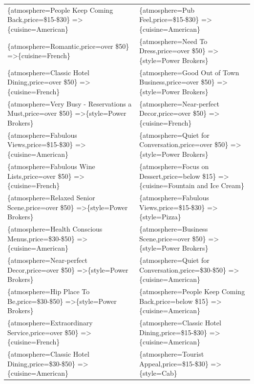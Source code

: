 \documentclass[letterpaper,10pt]{article}
\begin{document}
\begin{appendices}
\begin{table}[h]
\begin{adjustbox}{max width=\textwidth}
\begin{tabular}{ll}
\{atmosphere=People Keep Coming Back,price=\$15-\$30\} =\textgreater \{cuisine=American\} & \{atmosphere=Pub Feel,price=\$15-\$30\} =\textgreater \{cuisine=American\} \\ 
\{atmosphere=Romantic,price=over \$50\} =\textgreater \{cuisine=French\} & \{atmosphere=Need To Dress,price=over \$50\} =\textgreater \{style=Power Brokers\} \\ 
\{atmosphere=Classic Hotel Dining,price=over \$50\} =\textgreater \{cuisine=French\} & \{atmosphere=Good Out of Town Business,price=over \$50\} =\textgreater \{style=Power Brokers\} \\ 
\{atmosphere=Very Busy - Reservations a Must,price=over \$50\} =\textgreater \{style=Power Brokers\} & \{atmosphere=Near-perfect Decor,price=over \$50\} =\textgreater \{cuisine=French\} \\ 
\{atmosphere=Fabulous Views,price=\$15-\$30\} =\textgreater \{cuisine=American\} & \{atmosphere=Quiet for Conversation,price=over \$50\} =\textgreater \{style=Power Brokers\} \\ 
\{atmosphere=Fabulous Wine Lists,price=over \$50\} =\textgreater \{cuisine=French\} & \{atmosphere=Focus on Dessert,price=below \$15\} =\textgreater \{cuisine=Fountain and Ice Cream\} \\ 
\{atmosphere=Relaxed Senior Scene,price=over \$50\} =\textgreater \{style=Power Brokers\} & \{atmosphere=Fabulous Views,price=\$15-\$30\} =\textgreater \{style=Pizza\} \\ 
\{atmosphere=Health Conscious Menus,price=\$30-\$50\} =\textgreater \{cuisine=American\} & \{atmosphere=Business Scene,price=over \$50\} =\textgreater \{style=Power Brokers\} \\ 
\{atmosphere=Near-perfect Decor,price=over \$50\} =\textgreater \{style=Power Brokers\} & \{atmosphere=Quiet for Conversation,price=\$30-\$50\} =\textgreater \{cuisine=American\} \\ 
\{atmosphere=Hip Place To Be,price=\$30-\$50\} =\textgreater \{style=Power Brokers\} & \{atmosphere=People Keep Coming Back,price=below \$15\} =\textgreater \{cuisine=American\} \\ 
\{atmosphere=Extraordinary Service,price=over \$50\} =\textgreater \{cuisine=French\} & \{atmosphere=Classic Hotel Dining,price=\$15-\$30\} =\textgreater \{cuisine=American\} \\ 
\{atmosphere=Classic Hotel Dining,price=\$30-\$50\} =\textgreater \{cuisine=American\} & \{atmosphere=Tourist Appeal,price=\$15-\$30\} =\textgreater \{style=Cab\} \\ 

\end{tabular}
\end{adjustbox}
\end{table}
\end{appendices}
\end{document}
